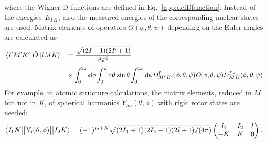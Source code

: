 where the Wigner D-functions are defined in Eq.~\eqref{app:defDfunction}. 
Instead of the energies~$E_{I\,K}$, also the measured energies of the corresponding nuclear states~\cite{ENSDF} are used. Matrix elements of operators $O(\phi,\theta,\psi)$ depending on the Euler angles are calculated as
\begin{alignat}{2}
&\left< I^{\prime}M^{\prime}K^{\prime} \right|\hat{O}\left|IMK\right>&&=\frac{\sqrt{(2I+1)(2I^{\prime}+1)}}{8\pi^2}\\[4pt]
&
&&\times
\int_0^{2\pi}\text{d}\phi \int_0^{\pi}\text{d}\theta\,\sin\theta \int_0^{2\pi}\text{d}\psi
D^{I^{\prime}}_{M^{\prime}\,K^{\prime}}(\phi,\theta,\psi)O(\phi,\theta,\psi) D^{I\,*}_{M\,K}(\phi,\theta,\psi)\notag
\end{alignat}
For example, in atomic structure calculations, the matrix elements, reduced in $M$ but not in $K$, of spherical harmonics $Y_{lm}(\theta,\phi)$ with rigid rotor states are needed:
\begin{align}
\left< I_1K\big{|}\big{|}\text{Y}_l(\theta,\phi)\big{|}\big{|}I_2K\right>=(-1)^{I_2+K}
\sqrt{(2I_1+1)(2I_2+1)(2l+1)/(4\pi)}
\left(
\begin{matrix}
I_1&I_2&l\\
-K&K&0
\end{matrix}
\right).\notag\\
\phantom{1}\label{eq:rigidRotRedElement} 
\end{align}







